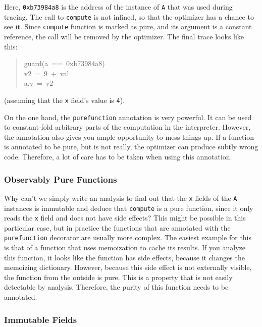 \documentclass{sig-alternate}
\begin{document}
Here, \texttt{0xb73984a8} is the address of the instance of \texttt{A} that was used
during tracing. The call to \texttt{compute} is not inlined, so that the optimizer
has a chance to see it. Since \texttt{compute} function is marked as pure, and its
argument
is a constant reference, the call will be removed by the optimizer. The final
trace looks like this:
%
\begin{quote}{\ttfamily \raggedright \noindent
guard(a~==~0xb73984a8)\\
v2~=~9~+~val\\
a.y~=~v2
}
\end{quote}

(assuming that the \texttt{x} field's value is \texttt{4}).

On the one hand, the \texttt{purefunction} annotation is very powerful. It can be
used to constant-fold arbitrary parts of the computation in the interpreter.
However, the annotation also gives you ample opportunity to mess things up. If a
function is annotated to be pure, but is not really, the optimizer can produce
subtly wrong code. Therefore, a lot of care has to be taken when using this
annotation.



\subsubsection{Observably Pure Functions}

Why can't we simply write an analysis to find out that the \texttt{x} fields of the
\texttt{A} instances is immutable and deduce that \texttt{compute} is a pure function,
since it only reads the \texttt{x} field and does not have side effects? This might
be possible in this particular case, but in practice the functions that are
annotated with the \texttt{purefunction} decorator are usually more complex.
The easiest example for this is that of a function that uses memoization to
cache its results. If you analyze this function, it looks like the function has
side effects, because it changes the memoizing dictionary. However, because this side
effect is not externally visible, the function from the outside is pure. This is
a property that is not easily detectable by analysis. Therefore, the purity
of this function needs to be annotated.



\subsubsection{Immutable Fields}
\end{document}
